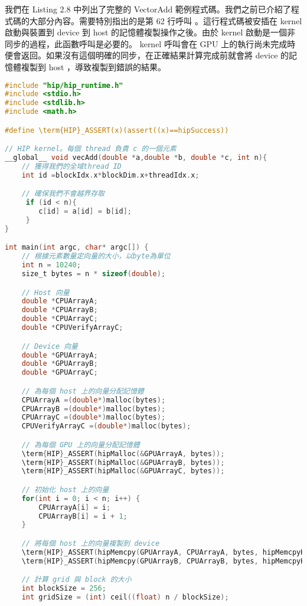 我們在 Listing 2.8 中列出了完整的 VectorAdd 範例程式碼。我們之前已介紹了程式碼的大部分內容。需要特別指出的是第 62 行呼叫  。這行程式碼被安插在 kernel 啟動與裝置到 device 到 host 的記憶體複製操作之後。由於 kernel 啟動是一個非同步的過程，此函數呼叫是必要的。 kernel 呼叫會在 GPU 上的執行尚未完成時便會返回。如果沒有這個明確的同步，在正確結果計算完成前就會將 device 的記憶體複製到 host ，導致複製到錯誤的結果。

\begin{lstlisting}[language=C, caption={完整的VectorAdd範例程式碼}, label={8th:example}]
#include "hip/hip_runtime.h"
#include <stdio.h>
#include <stdlib.h>
#include <math.h>

#define \term{HIP}_ASSERT(x)(assert((x)==hipSuccess))

// HIP kernel。每個 thread 負責 c 的一個元素
__global__ void vecAdd(double *a,double *b, double *c, int n){
    // 獲得我們的全域thread ID
    int id =blockIdx.x*blockDim.x+threadIdx.x;

    // 確保我們不會越界存取
     if (id < n){
        c[id] = a[id] = b[id];
     }
}

int main(int argc, char* argc[]) {
    // 根據元素數量定向量的大小，以byte為單位
    int n = 10240;
    size_t bytes = n * sizeof(double);

    // Host 向量
    double *CPUArrayA;
    double *CPUArrayB;
    double *CPUArrayC;
    double *CPUVerifyArrayC;

    // Device 向量
    double *GPUArrayA;
    double *GPUArrayB;
    double *GPUArrayC;

    // 為每個 host 上的向量分配記憶體
    CPUArrayA =(double*)malloc(bytes);
    CPUArrayB =(double*)malloc(bytes);
    CPUArrayC =(double*)malloc(bytes);
    CPUVerifyArrayC =(double*)malloc(bytes);

    // 為每個 GPU 上的向量分配記憶體
    \term{HIP}_ASSERT(hipMalloc(&GPUArrayA, bytes));
    \term{HIP}_ASSERT(hipMalloc(&GPUArrayB, bytes));
    \term{HIP}_ASSERT(hipMalloc(&GPUArrayC, bytes));

    // 初始化 host 上的向量
    for(int i = 0; i < n; i++) {
        CPUArrayA[i] = i;
        CPUArrayB[i] = i + 1;
    }

    // 將每個 host 上的向量複製到 device
    \term{HIP}_ASSERT(hipMemcpy(GPUArrayA, CPUArrayA, bytes, hipMemcpyHostToDevice));
    \term{HIP}_ASSERT(hipMemcpy(GPUArrayB, CPUArrayB, bytes, hipMemcpyHostToDevice));

    // 計算 grid 與 block 的大小
    int blockSize = 256;
    int gridSize = (int) ceil((float) n / blockSize);


\end{lstlisting}
